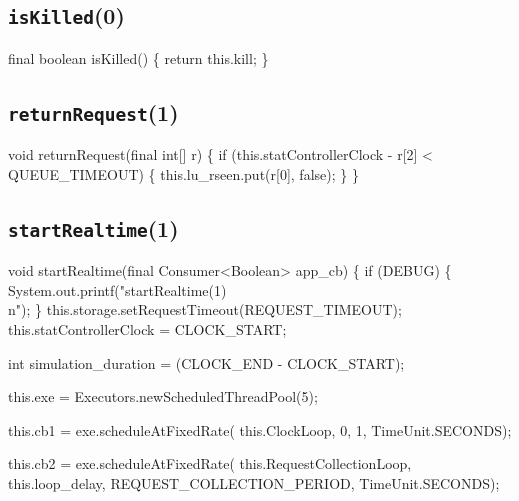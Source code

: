 \subsection{\texttt{isKilled}(0)}
\nwenddocs{}\endmoddef{}
final boolean isKilled() \{
  return this.kill;
\}
\eatline
{}\nwendcode{}\nwdocspar
\subsection{\texttt{returnRequest}(1)}
\nwenddocs{}\endmoddef{}
void returnRequest(final int[] r) \{
  if (this.statControllerClock - r[2] < QUEUE_TIMEOUT) \{
    this.lu_rseen.put(r[0], false);
  \}
\}
\eatline
{}\nwendcode{}\nwdocspar
\subsection{\texttt{startRealtime}(1)}
\nwenddocs{}\endmoddef{}
void startRealtime(final Consumer<Boolean> app_cb) \{
  if (DEBUG) \{
    System.out.printf("startRealtime(1)\\n");
  \}
  this.storage.setRequestTimeout(REQUEST_TIMEOUT);
  this.statControllerClock = CLOCK_START;

  int simulation_duration = (CLOCK_END - CLOCK_START);

  this.exe = Executors.newScheduledThreadPool(5);

  this.cb1 = exe.scheduleAtFixedRate(
    this.ClockLoop, 0, 1, TimeUnit.SECONDS);

  this.cb2 = exe.scheduleAtFixedRate(
    this.RequestCollectionLoop, this.loop_delay, REQUEST_COLLECTION_PERIOD, TimeUnit.SECONDS);


